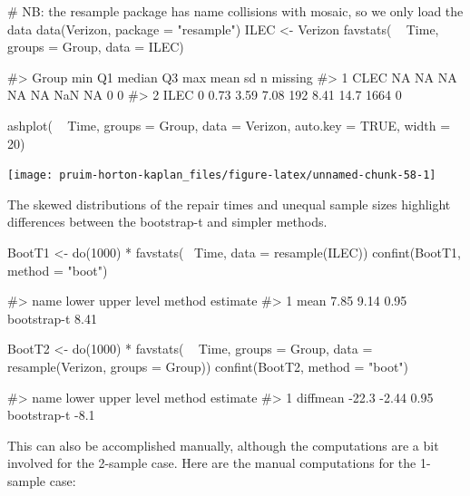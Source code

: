 \begin{Schunk}
\begin{Sinput}
# NB: the resample package has name collisions with mosaic, so we only load the data
data(Verizon, package = "resample")
ILEC <- Verizon %
favstats( ~ Time, groups = Group, data = ILEC)
\end{Sinput}
\begin{Soutput}
#>   Group min   Q1 median   Q3 max mean   sd    n missing
#> 1  CLEC  NA   NA     NA   NA  NA  NaN   NA    0       0
#> 2  ILEC   0 0.73   3.59 7.08 192 8.41 14.7 1664       0
\end{Soutput}
\begin{Sinput}
 ashplot( ~ Time, groups = Group, data = Verizon, auto.key = TRUE, width = 20)
\end{Sinput}


\begin{center}\texttt{[image: pruim-horton-kaplan\_files/figure-latex/unnamed-chunk-58-1]} \end{center}

\end{Schunk}

\noindent
The skewed distributions of the repair times and unequal sample sizes
highlight differences between the bootstrap-t and simpler methods.

\begin{Schunk}
\begin{Sinput}
BootT1 <- do(1000) * favstats(~ Time, data = resample(ILEC))
confint(BootT1, method = "boot")
\end{Sinput}
\begin{Soutput}
#>   name lower upper level      method estimate
#> 1 mean  7.85  9.14  0.95 bootstrap-t     8.41
\end{Soutput}
\begin{Sinput}
BootT2 <- do(1000) * favstats( ~ Time, groups = Group, data = resample(Verizon, groups = Group))
confint(BootT2, method = "boot")
\end{Sinput}
\begin{Soutput}
#>       name lower upper level      method estimate
#> 1 diffmean -22.3 -2.44  0.95 bootstrap-t     -8.1
\end{Soutput}
\end{Schunk}

\noindent
This can also be accomplished manually, although the computations are a
bit involved for the 2-sample case. Here are the manual computations for
the 1-sample case:

